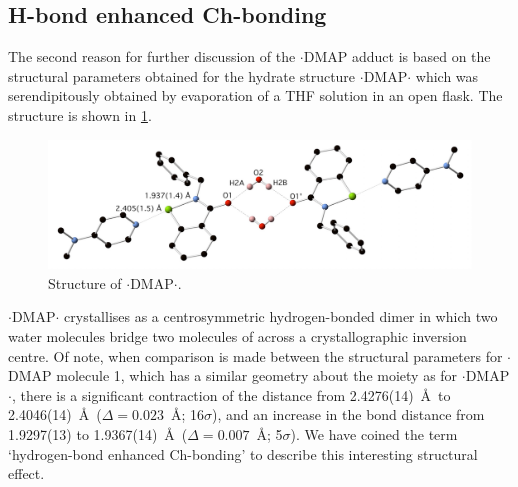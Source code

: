 \begin{refsection}
    \subsection{H-bond enhanced Ch-bonding}
    The second reason for further discussion of the $ \cdot $DMAP adduct is based on the structural parameters obtained for the hydrate structure $ \cdot $DMAP$ \cdot $ which was serendipitously obtained by evaporation of a THF solution in an open flask.
    The structure is shown in \cref{fig:benzyl-dmap-hydrate}.
    
    \begin{figure}
      \centering
      \includegraphics[width=0.8\linewidth]{Figures/benzyl-dmap-hydrate.pdf}
      \caption{Structure of $ \cdot $DMAP$ \cdot $.}\label{fig:benzyl-dmap-hydrate}
    \end{figure}
    
    $ \cdot $DMAP$ \cdot $ crystallises as a centrosymmetric hydrogen-bonded dimer in which two water molecules bridge two molecules of  across a crystallographic inversion centre.
    Of note, when comparison is made between the structural parameters for $ \cdot $DMAP molecule 1, which has a similar geometry about the  moiety as for $ \cdot $DMAP$ \cdot $, there is a significant contraction of the  distance from 2.4276(14)~\AA\ to 2.4046(14)~\AA\ ($ \Delta =0.023$~\AA{}; 16$ \sigma $), and an increase in the  bond distance from 1.9297(13) to 1.9367(14)~\AA\ ($ \Delta =0.007$~\AA{}; 5$ \sigma $).
    We have coined the term `hydrogen-bond enhanced Ch-bonding' to describe this interesting structural effect.
    

\end{refsection}
